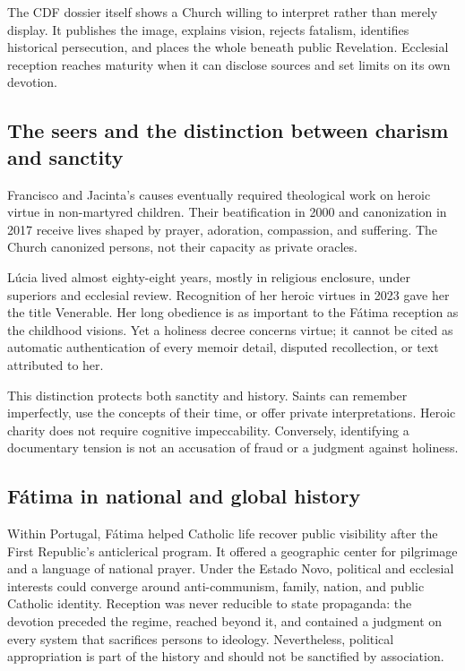 The CDF dossier itself shows a Church willing to interpret rather than merely display. It publishes the image, explains vision, rejects fatalism, identifies historical persecution, and places the whole beneath public Revelation. Ecclesial reception reaches maturity when it can disclose sources and set limits on its own devotion.

\subsection{The seers and the distinction between charism and sanctity}

Francisco and Jacinta's causes eventually required theological work on heroic virtue in non-martyred children. Their beatification in 2000 and canonization in 2017 receive lives shaped by prayer, adoration, compassion, and suffering. The Church canonized persons, not their capacity as private oracles.

Lúcia lived almost eighty-eight years, mostly in religious enclosure, under superiors and ecclesial review. Recognition of her heroic virtues in 2023 gave her the title Venerable. Her long obedience is as important to the Fátima reception as the childhood visions. Yet a holiness decree concerns virtue; it cannot be cited as automatic authentication of every memoir detail, disputed recollection, or text attributed to her.

This distinction protects both sanctity and history. Saints can remember imperfectly, use the concepts of their time, or offer private interpretations. Heroic charity does not require cognitive impeccability. Conversely, identifying a documentary tension is not an accusation of fraud or a judgment against holiness.

\subsection{Fátima in national and global history}

Within Portugal, Fátima helped Catholic life recover public visibility after the First Republic's anticlerical program. It offered a geographic center for pilgrimage and a language of national prayer. Under the Estado Novo, political and ecclesial interests could converge around anti-communism, family, nation, and public Catholic identity. Reception was never reducible to state propaganda: the devotion preceded the regime, reached beyond it, and contained a judgment on every system that sacrifices persons to ideology. Nevertheless, political appropriation is part of the history and should not be sanctified by association.

